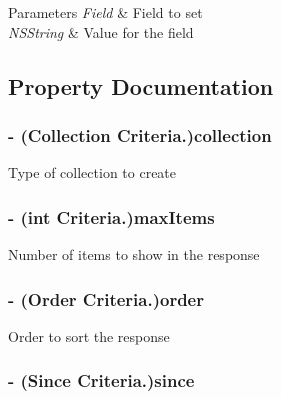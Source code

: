 \begin{DoxyParams}{Parameters}
{\em Field} & Field to set \\
\hline
{\em NSString} & Value for the field \\
\hline
\end{DoxyParams}


\subsection{Property Documentation}
\hypertarget{interface_criteria_a52906da275ae0744abeba6007790553f}{
\subsubsection[{collection}]{\setlength{\rightskip}{0pt plus 5cm}-\/ (Collection Criteria.)collection}}
\label{interface_criteria_a52906da275ae0744abeba6007790553f}
Type of collection to create \hypertarget{interface_criteria_a7de2a86a0167151d57ab63fa45e186c3}{
\subsubsection[{maxItems}]{\setlength{\rightskip}{0pt plus 5cm}-\/ (int Criteria.)maxItems}}
\label{interface_criteria_a7de2a86a0167151d57ab63fa45e186c3}
Number of items to show in the response \hypertarget{interface_criteria_af6652c36b822dbeda4ef46002149a7bc}{
\subsubsection[{order}]{\setlength{\rightskip}{0pt plus 5cm}-\/ (Order Criteria.)order}}
\label{interface_criteria_af6652c36b822dbeda4ef46002149a7bc}
Order to sort the response \hypertarget{interface_criteria_a9d2c4c96b4c91226f0d0aac9bce08a4f}{
\subsubsection[{since}]{\setlength{\rightskip}{0pt plus 5cm}-\/ (Since Criteria.)since}}
